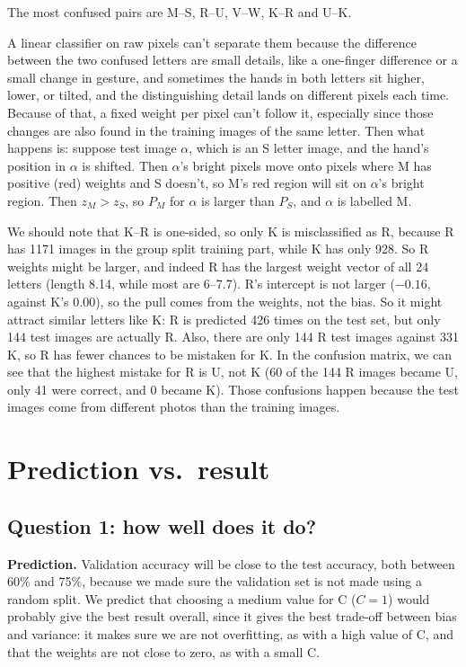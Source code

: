 The most confused pairs are M--S, R--U, V--W, K--R and U--K.

A linear classifier on raw pixels can't separate them because the difference between the two confused letters are small details, like a one-finger difference or a small change in gesture, and sometimes the hands in both letters sit higher, lower, or tilted, and the distinguishing detail lands on different pixels each time. Because of that, a fixed weight per pixel can't follow it, especially since those changes are also found in the training images of the same letter. Then what happens is: suppose test image $\alpha$, which is an S letter image, and the hand's position in $\alpha$ is shifted. Then $\alpha$'s bright pixels move onto pixels where M has positive (red) weights and S doesn't, so M's red region will sit on $\alpha$'s bright region. Then $z_M > z_S$, so $P_M$ for $\alpha$ is larger than $P_S$, and $\alpha$ is labelled M.

We should note that K--R is one-sided, so only K is misclassified as R, because R has 1171 images in the group split training part, while K has only 928. So R weights might be larger, and indeed R has the largest weight vector of all 24 letters (length 8.14, while most are 6--7.7). R's intercept is not larger ($-0.16$, against K's $0.00$), so the pull comes from the weights, not the bias. So it might attract similar letters like K: R is predicted 426 times on the test set, but only 144 test images are actually R. Also, there are only 144 R test images against 331 K, so R has fewer chances to be mistaken for K. In the confusion matrix, we can see that the highest mistake for R is U, not K (60 of the 144 R images became U, only 41 were correct, and 0 became K). Those confusions happen because the test images come from different photos than the training images.

\section{Prediction vs.\ result}

\subsection{Question 1: how well does it do?}

\textbf{Prediction.} Validation accuracy will be close to the test accuracy, both between 60\% and 75\%, because we made sure the validation set is not made using a random split. We predict that choosing a medium value for C ($C=1$) would probably give the best result overall, since it gives the best trade-off between bias and variance: it makes sure we are not overfitting, as with a high value of C, and that the weights are not close to zero, as with a small C.

